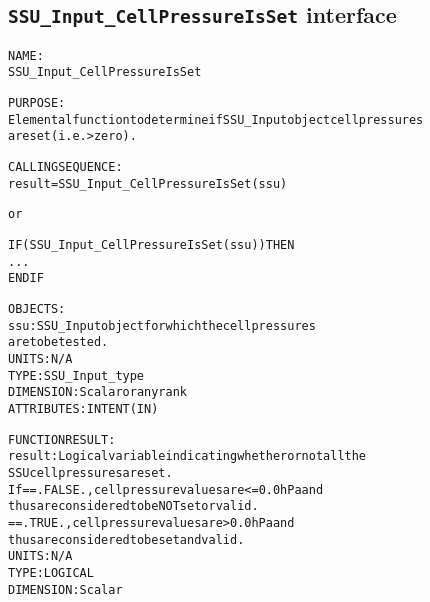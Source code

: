 \subsection{\texttt{SSU\_Input\_CellPressureIsSet} interface}
  \label{sec:SSU_Input_CellPressureIsSet_interface}
  \begin{alltt}
 
  NAME:
        SSU_Input_CellPressureIsSet
 
  PURPOSE:
        Elemental function to determine if SSU_Input object cell pressures
        are set (i.e. > zero).
 
  CALLING SEQUENCE:
        result = SSU_Input_CellPressureIsSet( ssu )
 
          or
 
        IF ( SSU_Input_CellPressureIsSet( ssu ) ) THEN
          ...
        END IF
 
  OBJECTS:
        ssu:       SSU_Input object for which the cell pressures
                   are to be tested.
                   UNITS:      N/A
                   TYPE:       SSU_Input_type
                   DIMENSION:  Scalar or any rank
                   ATTRIBUTES: INTENT(IN)
 
  FUNCTION RESULT:
        result:    Logical variable indicating whether or not all the
                   SSU cell pressures are set.
                   If == .FALSE., cell pressure values are <= 0.0hPa and
                                  thus are considered to be NOT set or valid.
                      == .TRUE.,  cell pressure values are > 0.0hPa and
                                  thus are considered to be set and valid.
                   UNITS:      N/A
                   TYPE:       LOGICAL
                   DIMENSION:  Scalar
 
  \end{alltt}
